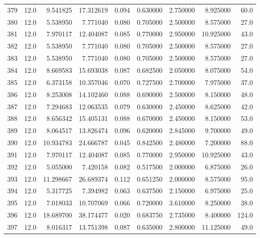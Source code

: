 \begin{tabular}{lrrrrrrrr}
379  &   12.0 &   9.541825 &  17.312619 &  0.094 &  0.630000 &  2.750000 &   8.925000 &   60.0 \\
380  &   12.0 &   5.538950 &   7.771040 &  0.080 &  0.705000 &  2.500000 &   8.575000 &   27.0 \\
381  &   12.0 &   7.970117 &  12.404087 &  0.085 &  0.770000 &  2.950000 &  10.925000 &   43.0 \\
382  &   12.0 &   5.538950 &   7.771040 &  0.080 &  0.705000 &  2.500000 &   8.575000 &   27.0 \\
383  &   12.0 &   5.538950 &   7.771040 &  0.080 &  0.705000 &  2.500000 &   8.575000 &   27.0 \\
384  &   12.0 &   8.669583 &  15.693038 &  0.087 &  0.682500 &  2.050000 &   8.075000 &   54.0 \\
385  &   12.0 &   6.373158 &  10.357046 &  0.070 &  0.727500 &  2.700000 &   7.975000 &   37.0 \\
386  &   12.0 &   8.253008 &  14.102460 &  0.088 &  0.690000 &  2.500000 &   8.150000 &   48.0 \\
387  &   12.0 &   7.294683 &  12.063535 &  0.079 &  0.630000 &  2.450000 &   8.625000 &   42.0 \\
388  &   12.0 &   8.656342 &  15.405131 &  0.088 &  0.670000 &  2.450000 &   8.150000 &   53.0 \\
389  &   12.0 &   8.064517 &  13.826474 &  0.096 &  0.620000 &  2.845000 &   9.700000 &   49.0 \\
390  &   12.0 &  10.934783 &  24.666787 &  0.045 &  0.842500 &  2.480000 &   7.200000 &   88.0 \\
391  &   12.0 &   7.970117 &  12.404087 &  0.085 &  0.770000 &  2.950000 &  10.925000 &   43.0 \\
392  &   12.0 &   5.055000 &   7.420158 &  0.082 &  0.517500 &  2.000000 &   6.875000 &   26.0 \\
393  &   12.0 &  11.298667 &  26.689374 &  0.112 &  0.651250 &  2.000000 &   8.575000 &   95.0 \\
394  &   12.0 &   5.317725 &   7.394982 &  0.063 &  0.637500 &  2.150000 &   6.975000 &   25.0 \\
395  &   12.0 &   7.018033 &  10.707069 &  0.066 &  0.720000 &  3.610000 &   8.250000 &   38.0 \\
396  &   12.0 &  18.689700 &  38.174477 &  0.020 &  0.683750 &  2.735000 &   8.400000 &  124.0 \\
397  &   12.0 &   8.016317 &  13.751398 &  0.087 &  0.635000 &  2.800000 &  11.125000 &   49.0 \\

\end{tabular}
